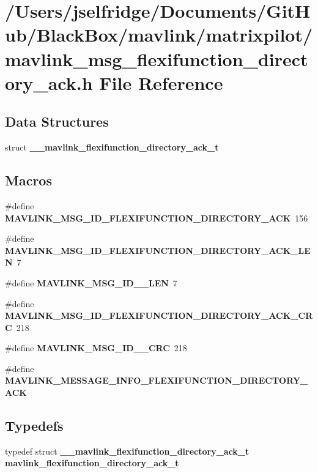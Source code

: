 \section{/\+Users/jselfridge/\+Documents/\+Git\+Hub/\+Black\+Box/mavlink/matrixpilot/mavlink\+\_\+msg\+\_\+flexifunction\+\_\+directory\+\_\+ack.h File Reference}
\label{mavlink__msg__flexifunction__directory__ack_8h}
\subsection*{Data Structures}
\begin{DoxyCompactItemize}
\item 
struct \textbf{ \+\_\+\+\_\+mavlink\+\_\+flexifunction\+\_\+directory\+\_\+ack\+\_\+t}
\end{DoxyCompactItemize}
\subsection*{Macros}
\begin{DoxyCompactItemize}
\item 
\#define \textbf{ M\+A\+V\+L\+I\+N\+K\+\_\+\+M\+S\+G\+\_\+\+I\+D\+\_\+\+F\+L\+E\+X\+I\+F\+U\+N\+C\+T\+I\+O\+N\+\_\+\+D\+I\+R\+E\+C\+T\+O\+R\+Y\+\_\+\+A\+CK}~156
\item 
\#define \textbf{ M\+A\+V\+L\+I\+N\+K\+\_\+\+M\+S\+G\+\_\+\+I\+D\+\_\+\+F\+L\+E\+X\+I\+F\+U\+N\+C\+T\+I\+O\+N\+\_\+\+D\+I\+R\+E\+C\+T\+O\+R\+Y\+\_\+\+A\+C\+K\+\_\+\+L\+EN}~7
\item 
\#define \textbf{ M\+A\+V\+L\+I\+N\+K\+\_\+\+M\+S\+G\+\_\+\+I\+D\+\_\+\_\+\+L\+EN}~7
\item 
\#define \textbf{ M\+A\+V\+L\+I\+N\+K\+\_\+\+M\+S\+G\+\_\+\+I\+D\+\_\+\+F\+L\+E\+X\+I\+F\+U\+N\+C\+T\+I\+O\+N\+\_\+\+D\+I\+R\+E\+C\+T\+O\+R\+Y\+\_\+\+A\+C\+K\+\_\+\+C\+RC}~218
\item 
\#define \textbf{ M\+A\+V\+L\+I\+N\+K\+\_\+\+M\+S\+G\+\_\+\+I\+D\+\_\+\_\+\+C\+RC}~218
\item 
\#define \textbf{ M\+A\+V\+L\+I\+N\+K\+\_\+\+M\+E\+S\+S\+A\+G\+E\+\_\+\+I\+N\+F\+O\+\_\+\+F\+L\+E\+X\+I\+F\+U\+N\+C\+T\+I\+O\+N\+\_\+\+D\+I\+R\+E\+C\+T\+O\+R\+Y\+\_\+\+A\+CK}
\end{DoxyCompactItemize}
\subsection*{Typedefs}
\begin{DoxyCompactItemize}
\item 
typedef struct \textbf{ \+\_\+\+\_\+mavlink\+\_\+flexifunction\+\_\+directory\+\_\+ack\+\_\+t} \textbf{ mavlink\+\_\+flexifunction\+\_\+directory\+\_\+ack\+\_\+t}
\end{DoxyCompactItemize}


